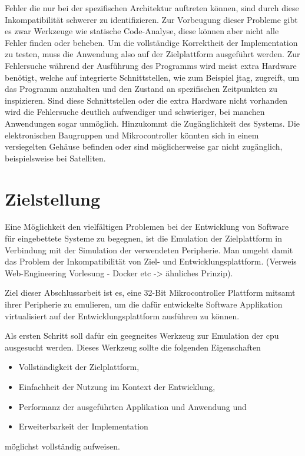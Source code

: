 Fehler die nur bei der spezifischen Architektur auftreten können, sind durch
diese Inkompatibilität schwerer zu identifizieren.
Zur Vorbeugung dieser Probleme gibt es zwar Werkzeuge wie statische Code-Analyse,
diese können aber nicht alle Fehler finden oder beheben. 
Um die vollständige Korrektheit der Implementation zu testen, muss die Anwendung
also auf der Zielplattform ausgeführt werden. \newline
Zur Fehlersuche während der Ausführung des Programms wird meist extra Hardware benötigt,
welche auf integrierte Schnittstellen, wie zum Beispiel \ac{jtag}, zugreift,
um das Programm anzuhalten und den Zustand an spezifischen Zeitpunkten zu inspizieren.
Sind diese Schnittstellen oder die extra Hardware nicht vorhanden wird die Fehlersuche
deutlich aufwendiger und schwieriger, bei manchen Anwendungen sogar unmöglich.
Hinzukommt die Zugänglichkeit des Systems.
Die elektronischen Baugruppen und Mikrocontroller könnten sich in einem
versiegelten Gehäuse befinden oder sind möglicherweise gar nicht zugänglich,
beispielsweise bei Satelliten.

\section{Zielstellung}

Eine Möglichkeit den vielfältigen Problemen bei der Entwicklung von Software
für eingebettete Systeme zu begegnen, ist die Emulation der Zielplattform in Verbindung
mit der Simulation der verwendeten Peripherie.
Man umgeht damit das Problem der Inkompatibilität von Ziel- und Entwicklungsplattform.\newline
(Verweis Web-Engineering Vorlesung - Docker etc -> ähnliches Prinzip).

Ziel dieser Abschlussarbeit ist es, eine 32-Bit Mikrocontroller Plattform mitsamt
ihrer Peripherie zu emulieren, um die dafür entwickelte Software Applikation
virtualisiert auf der Entwicklungsplattform ausführen zu können.

Als ersten Schritt soll dafür ein geegneites Werkzeug zur Emulation der \ac{cpu}
ausgesucht werden.
Dieses Werkzeug sollte die folgenden Eigenschaften
\begin{itemize}
    \item Vollständigkeit der Zielplattform,
    \item Einfachheit der Nutzung im Kontext der Entwicklung,
    \item Performanz der ausgeführten Applikation und Anwendung und
    \item Erweiterbarkeit der Implementation
\end{itemize}
möglichst vollständig aufweisen.

